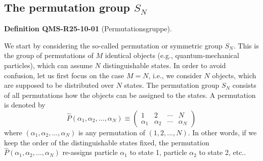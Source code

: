 \documentclass[10pt, letterpaper]{article}
\newcommand{\CustomHeading}[3]{%
  \par\medskip\noindent%
  \textbf{#1 #2} \textnormal{(#3)}.\enskip%
}
\newenvironment{DEF}[2]{\begin{unitbox}\CustomHeading{Definition}{#1}{#2}}{\end{unitbox}}
\begin{document}
\subsection{The permutation group $S_{N}$}


\begin{DEF}{QMS-R25-10-01}{Permutationsgruppe}
We start by considering the so-called permutation or symmetric group $S_{N}$. This is the group of permutations of $M$ identical objects (e.g., quantum-mechanical particles), which can assume $N$ distinguishable states. In order to avoid confusion, let us first focus on the case $M=N$, i.e., we consider $N$ objects, which are supposed to be distributed over $N$ states. The permutation group $S_{N}$ consists of all permutations how the objects can be assigned to the states. A permutation is denoted by
$$
\hat{P}\left(\alpha_{1}, \alpha_{2}, \ldots, \alpha_{N}\right) \equiv\left(\begin{array}{cccc}
1 & 2 & \cdots & N \\
\alpha_{1} & \alpha_{2} & \cdots & \alpha_{N}
\end{array}\right)
$$
where $\left(\alpha_{1}, \alpha_{2}, \ldots, \alpha_{N}\right)$ is any permutation of $(1,2, \ldots, N)$. In other words, if we keep the order of the distinguishable states fixed, the permutation $\hat{P}\left(\alpha_{1}, \alpha_{2}, \ldots, \alpha_{N}\right)$ re-assigns particle $\alpha_{1}$ to state 1, particle $\alpha_{2}$ to state 2, etc..
\end{DEF}
\end{document}
